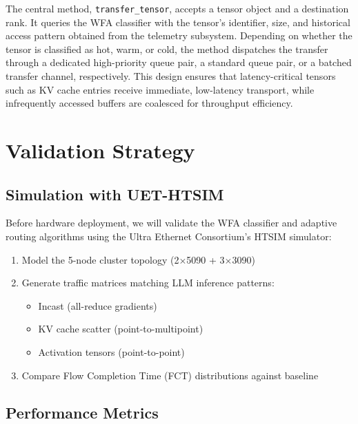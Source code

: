 \documentclass[11pt,letterpaper]{article}
\theoremstyle{definition}
\begin{document}
The central method, \texttt{transfer\_tensor}, accepts a tensor object and a destination rank.
It queries the WFA classifier with the tensor's identifier, size, and historical access pattern obtained from the telemetry subsystem.
Depending on whether the tensor is classified as hot, warm, or cold, the method dispatches the transfer through a dedicated high-priority queue pair, a standard queue pair, or a batched transfer channel, respectively.
This design ensures that latency-critical tensors such as KV cache entries receive immediate, low-latency transport, while infrequently accessed buffers are coalesced for throughput efficiency.

\section{Validation Strategy}

\subsection{Simulation with UET-HTSIM}

Before hardware deployment, we will validate the WFA classifier and adaptive routing algorithms using the Ultra Ethernet Consortium's HTSIM simulator:

\begin{enumerate}
    \item Model the 5-node cluster topology (2$\times$5090 + 3$\times$3090)
    \item Generate traffic matrices matching LLM inference patterns:
    \begin{itemize}
        \item Incast (all-reduce gradients)
        \item KV cache scatter (point-to-multipoint)
        \item Activation tensors (point-to-point)
    \end{itemize}
    \item Compare Flow Completion Time (FCT) distributions against baseline
\end{enumerate}

\subsection{Performance Metrics}
\end{document}
